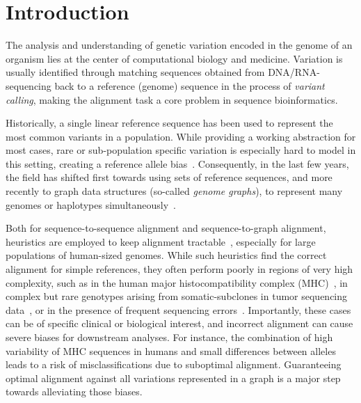 
\section{Introduction}

The analysis and understanding of genetic variation encoded in the genome of an
organism lies at the center of computational biology and medicine. Variation is
usually identified through matching sequences obtained from DNA/RNA-sequencing
back to a reference (genome) sequence in the process of \emph{variant calling},
making the alignment task a core problem in sequence bioinformatics.

Historically, a single linear reference sequence has been used to represent the
most common variants in a population. While providing a working abstraction for
most cases, rare or sub-population specific variation is especially hard to
model in this setting, creating a reference allele
bias~\cite{stevenson_sources_2013,brandt_mapping_2015}. Consequently, in the
last few years, the field has shifted first towards using sets of reference
sequences, and more recently to graph data structures (so-called {\em genome
graphs}), to represent many genomes or haplotypes
simultaneously~\cite{dilthey_improved_2015,paten_genome_2017,garrison_variation_2018}.

Both for sequence-to-sequence alignment and sequence-to-graph alignment,
heuristics are employed to keep alignment
tractable~\cite{altschul_basic_1990,langmead_fast_2012,garrison_variation_2018},
especially for large populations of human-sized genomes.
%
While such heuristics find the correct alignment for simple references, they
often perform poorly in regions of very high complexity, such as in the human
major histocompatibility complex (MHC)~\cite{dilthey_improved_2015}, in complex
but rare genotypes arising from somatic-subclones in tumor sequencing
data~\cite{harismendy_detection_2011}, or in the presence of frequent sequencing
errors~\cite{salmela_lordec_2014}.
%
Importantly, these cases can be of specific clinical or biological interest, and
incorrect alignment can cause severe biases for downstream analyses. For
instance, the combination of high variability of MHC sequences in humans and
small differences between alleles~\cite{buhler_hla_2011} leads to a risk of
misclassifications due to suboptimal alignment. Guaranteeing optimal alignment
against all variations represented in a graph is a major step towards
alleviating those biases.

